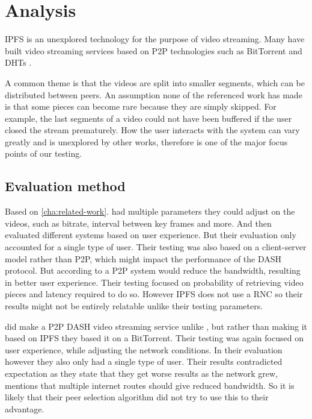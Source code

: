 \chapter{Analysis}
\label{cha:analysis}

\acs{IPFS} is an unexplored technology for the purpose of video streaming. Many have built video streaming services based on \acs{P2P} technologies such as BitTorrent and \acs{DHT}s \cite{gazdar2017toward}.

A common theme is that the videos are split into smaller segments, which can be distributed between peers. An assumption none of the referenced work has made is that some pieces can become rare because they are simply skipped. For example, the last segments of a video could not have been buffered if the user closed the stream prematurely. How the user interacts with the system can vary greatly and is unexplored by other works, therefore is one of the major focus points of our testing.

\section{Evaluation method}
Based on \autoref{cha:related-work}.
\citeauthor{aloman2015performance} \cite{aloman2015performance} had multiple parameters they could adjust on the videos, such as bitrate, interval between key frames and more. And then evaluated different systems based on user experience. But their evaluation only accounted for a single type of user. Their testing was also based on a client-server model rather than \acs{P2P}, which might impact the performance of the \acs{DASH} protocol. But according to \citeauthor{nguyen2009p2p} a \acs{P2P} system would reduce the bandwidth, resulting in better user experience. Their testing focused on probability of retrieving video pieces and latency required to do so. However \acs{IPFS} does not use a \acs{RNC} so their results might not be entirely relatable unlike their testing parameters.

\citeauthor{gazdar2017toward} \cite{gazdar2017toward} did make a \acs{P2P} \acs{DASH} video streaming service unlike \citeauthor{aloman2015performance}, but rather than making it based on \acs{IPFS} they based it on a BitTorrent. Their testing was again focused on user experience, while adjusting the network conditions. In their evaluation however they also only had a single type of user. Their results contradicted expectation as they state that they get worse results as the  network grew, \citeauthor{nguyen2009p2p} mentions that multiple internet routes should give reduced bandwidth. So it is likely that their peer selection algorithm did not try to use this to their advantage.

